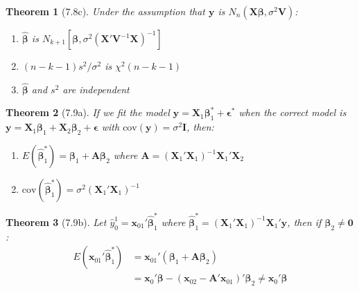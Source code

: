 \documentclass{article}
\newtheorem{theorem}{Theorem}[section]
\begin{document}
\begin{theorem}[7.8c]
Under the assumption that $\mathbf{y}$ is $N_n(\mathbf{X}\boldsymbol{\beta}, \sigma^2\mathbf{V})$:
\begin{enumerate}[label=(\roman*)]
\item $\hat{\boldsymbol{\beta}}$ is $N_{k+1}[\boldsymbol{\beta}, \sigma^2(\mathbf{X}'\mathbf{V}^{-1}\mathbf{X})^{-1}]$
\item $(n-k-1)s^2/\sigma^2$ is $\chi^2(n-k-1)$
\item $\hat{\boldsymbol{\beta}}$ and $s^2$ are independent
\end{enumerate}
\end{theorem}

\begin{theorem}[7.9a]
If we fit the model $\mathbf{y} = \mathbf{X}_1\boldsymbol{\beta}_1^* + \boldsymbol{\epsilon}^*$ when the correct model is $\mathbf{y} = \mathbf{X}_1\boldsymbol{\beta}_1 + \mathbf{X}_2\boldsymbol{\beta}_2 + \boldsymbol{\epsilon}$ with $\text{cov}(\mathbf{y}) = \sigma^2\mathbf{I}$, then:
\begin{enumerate}[label=(\roman*)]
\item $E(\hat{\boldsymbol{\beta}}_1^*) = \boldsymbol{\beta}_1 + \mathbf{A}\boldsymbol{\beta}_2$ where $\mathbf{A} = (\mathbf{X}_1'\mathbf{X}_1)^{-1}\mathbf{X}_1'\mathbf{X}_2$
\item $\text{cov}(\hat{\boldsymbol{\beta}}_1^*) = \sigma^2(\mathbf{X}_1'\mathbf{X}_1)^{-1}$
\end{enumerate}
\end{theorem}

\begin{theorem}[7.9b]
Let $\hat{y}_0^1 = \mathbf{x}_{01}'\hat{\boldsymbol{\beta}}_1^*$ where $\hat{\boldsymbol{\beta}}_1^* = (\mathbf{X}_1'\mathbf{X}_1)^{-1}\mathbf{X}_1'\mathbf{y}$, then if $\boldsymbol{\beta}_2 \neq \mathbf{0}$:
\begin{align*}
E(\mathbf{x}_{01}'\hat{\boldsymbol{\beta}}_1^*) &= \mathbf{x}_{01}'(\boldsymbol{\beta}_1 + \mathbf{A}\boldsymbol{\beta}_2) \\
&= \mathbf{x}_0'\boldsymbol{\beta} - (\mathbf{x}_{02} - \mathbf{A}'\mathbf{x}_{01})'\boldsymbol{\beta}_2 \neq \mathbf{x}_0'\boldsymbol{\beta}
\end{align*}
\end{theorem}
\end{document}
